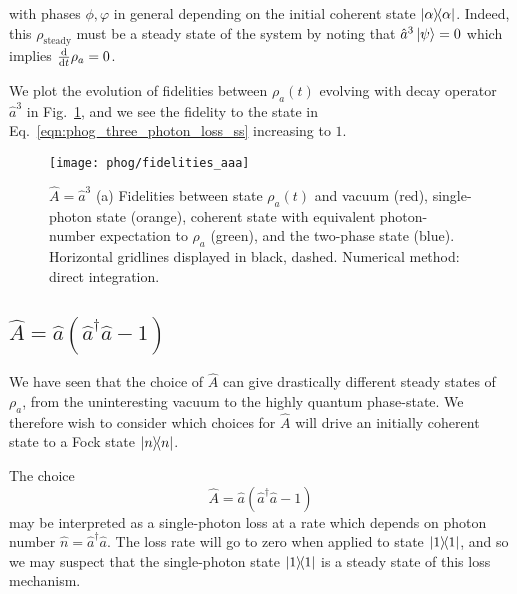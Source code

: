 \noindent with phases $\phi, \varphi$ in general depending on the initial coherent state $\dyad{\alpha}$. %
Indeed, this $\rho_{\text{steady}}$ must be a steady state of the system by noting that $\hat{a}^3 \ket{\psi} = 0$ which implies $\frac{\mathrm{d}}{\mathrm{d}t} \rho_a = 0$.

We plot the evolution of fidelities between $\rho_a\left(t\right)$ evolving with decay operator $\hat{a}^3$ in Fig.~\ref{fig:phog_lindblad_three_photon_loss}, and we see the fidelity to the state in Eq.~\ref{eqn:phog_three_photon_loss_ss} increasing to $1$. 

\begin{figure}[htp]
\centering
\texttt{[image: phog/fidelities\_aaa]}
\caption{\label{fig:phog_lindblad_three_photon_loss}$\hat{A} = \hat{a}^3$ (a) Fidelities between state $\rho_a\left(t\right)$ and vacuum (red), single-photon state (orange), coherent state with equivalent photon-number expectation to $\rho_a$ (green), and the two-phase state (blue).  Horizontal gridlines displayed in black, dashed. Numerical method: direct integration.}
\end{figure}
\fi

\clearpage
\subsection{$\hat{A} = \hat{a}\left(\hat{a}^\dagger \hat{a} - 1\right)$}\label{sec:A_ncl}
We have seen that the choice of $\hat{A}$ can give drastically different steady states of $\rho_a$,  from the uninteresting vacuum to the highly quantum phase-state. We therefore wish to consider which choices for $\hat{A}$ will drive an initially coherent state to a Fock state $\dyad{n}$. 

The choice 
\begin{equation}\label{eqn:phog_A_ncl}
\hat{A} = \hat{a}\left(\hat{a}^\dagger \hat{a} - 1\right)
\end{equation}
may be interpreted as a single-photon loss at a rate which depends on photon number $\hat{n} = \hat{a}^\dagger \hat{a}$. The loss rate will go to zero when applied to state $\dyad{1}$, and so we may suspect that the single-photon state $\dyad{1}$ is a steady state of this loss mechanism.

